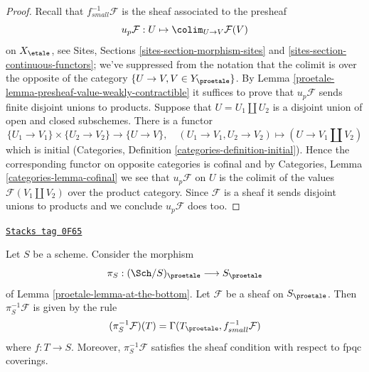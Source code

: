 \begin{proof}

Recall that $f_{small}^{-1}\mathcal{F}$ is the sheaf associated to the
presheaf
$$
u_p\mathcal{F} : U \mapsto \colim_{U \to V} \mathcal{F}(V)
$$
on $X_\etale$, see Sites, Sections \ref{sites-section-morphism-sites} and
\ref{sites-section-continuous-functors}; we've suppressed from the notation
that the colimit is over the opposite of the category
$\{U \to V, V \in Y_\proetale\}$. By
Lemma \ref{proetale-lemma-presheaf-value-weakly-contractible}
it suffices to prove that $u_p\mathcal{F}$ sends finite disjoint unions
to products.
Suppose that $U = U_1 \amalg U_2$ is a disjoint union of open and closed
subschemes. There is a functor
$$
\{U_1 \to V_1\} \times \{U_2 \to V_2\} \longrightarrow
\{U \to V\},\quad
(U_1 \to V_1, U_2 \to V_2) \longmapsto (U \to V_1 \amalg V_2)
$$
which is initial (Categories, Definition \ref{categories-definition-initial}).
Hence the corresponding functor on opposite categories is cofinal and
by Categories, Lemma \ref{categories-lemma-cofinal} we see
that $u_p\mathcal{F}$ on $U$ is the colimit of the values
$\mathcal{F}(V_1 \amalg V_2)$ over the product category.
Since $\mathcal{F}$ is a sheaf it sends disjoint unions to products and
we conclude $u_p\mathcal{F}$ does too.
\end{proof}

\begin{lemma}
\label{proetale-lemma-describe-pullback}
\href{https://stacks.math.columbia.edu/tag/0F65}{\texttt{Stacks tag 0F65}}

Let $S$ be a scheme. Consider the morphism
$$
\pi_S : (\Sch/S)_\proetale \longrightarrow S_\proetale
$$
of Lemma \ref{proetale-lemma-at-the-bottom}. Let $\mathcal{F}$ be a sheaf on
$S_\proetale$. Then $\pi_S^{-1}\mathcal{F}$ is given by the rule
$$
(\pi_S^{-1}\mathcal{F})(T) = \Gamma(T_\proetale, f_{small}^{-1}\mathcal{F})
$$
where $f : T \to S$. Moreover, $\pi_S^{-1}\mathcal{F}$ satisfies the
sheaf condition with respect to fpqc coverings.
\end{lemma}


